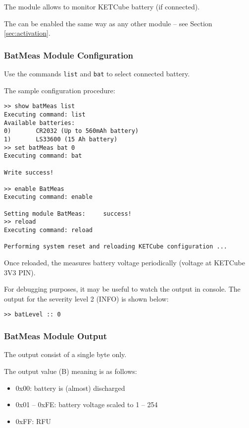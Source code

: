 The  module allows to monitor KETCube battery (if connected). 

The  can be enabled the same way as any other module -- see Section \ref{sec:activation}.

\subsubsection{BatMeas Module Configuration}
  Use the commands {\tt list} and {\tt bat} to select connected battery.
  
  The sample configuration procedure:
  
\begin{docCodeExample}
\begin{verbatim}
>> show batMeas list
Executing command: list
Available batteries:
0)       CR2032 (Up to 560mAh battery)
1)       LS33600 (15 Ah battery)
>> set batMeas bat 0
Executing command: bat

Write success!

>> enable BatMeas
Executing command: enable

Setting module BatMeas:     success!
>> reload
Executing command: reload

Performing system reset and reloading KETCube configuration ...
\end{verbatim}
\end{docCodeExample}

  Once reloaded, the  measures battery voltage periodically (voltage at KETCube 3V3 PIN). 
  
For debugging purposes, it may be useful to watch the  output in console. The output for the severity level 2 (INFO) is shown below:

\begin{docCodeExample}
\begin{verbatim}
>> batLevel :: 0
\end{verbatim}
\end{docCodeExample}

\subsubsection{BatMeas Module Output}
  The  output consist of a single byte only.
  
  The  output value (B) meaning is as follows:
  
  \begin{itemize}
    \item 0x00: battery is (almost) discharged
    \item 0x01 -- 0xFE: battery voltage scaled to 1 -- 254
    \item 0xFF: RFU
  \end{itemize}
  
